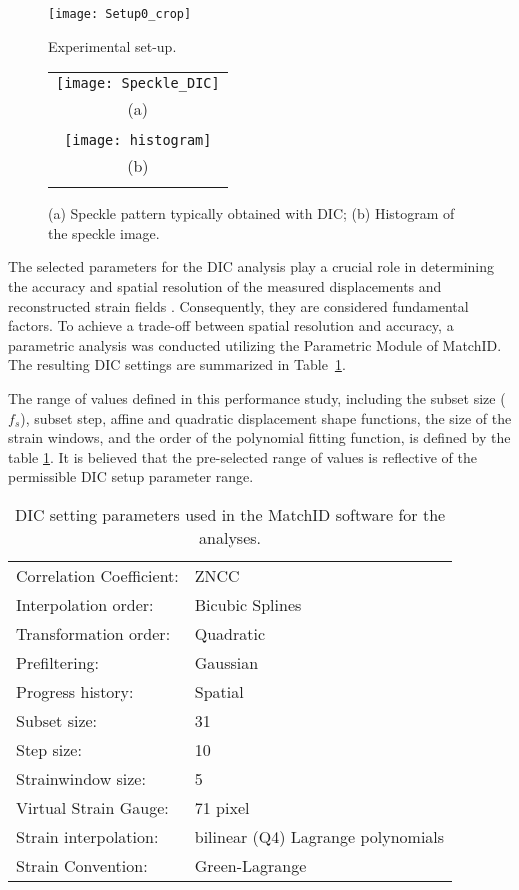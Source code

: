 \begin{figure}[htp]
	\centering
	\texttt{[image: Setup0\_crop]}
	\caption{Experimental set-up.}
	\label{fig:Setup0°}
\end{figure}


\begin{figure}[htp]
	\centering
	\begin{tabular}{c}
		\texttt{[image: Speckle\_DIC]} \\
		(a) \\
		\\
		\texttt{[image: histogram]} \\
		(b) \\
		\\
	\end{tabular}
	\caption{(a) Speckle pattern typically obtained with DIC; (b) Histogram of the speckle image.}
	\label{fig:Speckle_DIC}
\end{figure}


The selected parameters for the DIC analysis play a crucial role in determining the accuracy and spatial resolution of the measured displacements and reconstructed strain fields \citep{Xavier2012207,PereiraandXavier2018}. Consequently, they are considered fundamental factors. To achieve a trade-off between spatial resolution and accuracy, a parametric analysis was conducted utilizing the Parametric Module of MatchID. The resulting DIC settings are summarized in Table~\ref{tab:MatchID_param}.

The range of values defined in this performance study, including the subset size ($f_s$), subset step, affine and quadratic displacement shape functions, the size of the strain windows, and the order of the polynomial fitting function, is defined by the table \ref{tab:MatchID_param}. It is believed that the pre-selected range of values is reflective of the permissible DIC setup parameter range.

\begin{table}[]
	\centering
	\begin{tabular}{m{}m{}}\toprule
		Correlation   Coefficient: & ZNCC \\
		Interpolation order: & Bicubic Splines \\ 
		Transformation order: & Quadratic \\
		Prefiltering: & Gaussian \\
		Progress history: & Spatial \\
		Subset size: & 31 \\
		Step size: & 10 \\
		Strainwindow size: & 5 \\ 
		Virtual Strain Gauge: & 71 pixel \\
		Strain interpolation: & bilinear (Q4) Lagrange polynomials\\
		Strain Convention: & Green-Lagrange \\\bottomrule
	\end{tabular}
	\caption{DIC setting parameters used in the MatchID software for the analyses.}
	\label{tab:MatchID_param}
\end{table}


